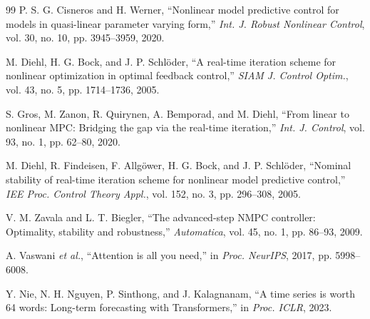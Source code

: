 \documentclass[journal]{IEEEtran}
\begin{document}
\begin{thebibliography}{99}
P. S. G. Cisneros and H. Werner, ``Nonlinear model predictive control for models in quasi-linear parameter varying form,'' \emph{Int. J. Robust Nonlinear Control}, vol. 30, no. 10, pp. 3945--3959, 2020.

M. Diehl, H. G. Bock, and J. P. Schl\"oder, ``A real-time iteration scheme for nonlinear optimization in optimal feedback control,'' \emph{SIAM J. Control Optim.}, vol. 43, no. 5, pp. 1714--1736, 2005.

S. Gros, M. Zanon, R. Quirynen, A. Bemporad, and M. Diehl, ``From linear to nonlinear MPC: Bridging the gap via the real-time iteration,'' \emph{Int. J. Control}, vol. 93, no. 1, pp. 62--80, 2020.

M. Diehl, R. Findeisen, F. Allg\"ower, H. G. Bock, and J. P. Schl\"oder, ``Nominal stability of real-time iteration scheme for nonlinear model predictive control,'' \emph{IEE Proc. Control Theory Appl.}, vol. 152, no. 3, pp. 296--308, 2005.

V. M. Zavala and L. T. Biegler, ``The advanced-step NMPC controller: Optimality, stability and robustness,'' \emph{Automatica}, vol. 45, no. 1, pp. 86--93, 2009.

A. Vaswani \emph{et al.}, ``Attention is all you need,'' in \emph{Proc. NeurIPS}, 2017, pp. 5998--6008.

Y. Nie, N. H. Nguyen, P. Sinthong, and J. Kalagnanam, ``A time series is worth 64 words: Long-term forecasting with Transformers,'' in \emph{Proc. ICLR}, 2023.

\end{thebibliography}
\end{document}
